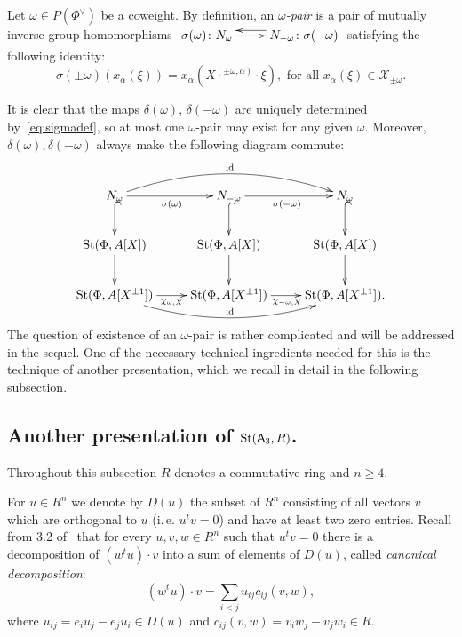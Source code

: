 \begin{dfn} \label{dfn:delta-pair}
Let $\omega \in P(\Phi^\vee)$ be a coweight.
By definition, an {\it $\omega$-pair} is a pair of mutually inverse group homomorphisms
$\xymatrix{ \sigma(\omega)\colon N_\omega \ar[r] & \ar@<-1.0ex>[l] N_{-\omega}\colon \sigma(-\omega) }$ satisfying the following identity:
\begin{equation} \label{eq:sigmadef}
\sigma(\pm \omega)(x_\alpha(\xi)) = x_\alpha(X^{(\pm \omega, \alpha)}\cdot \xi),
 \text{ for all } x_\alpha(\xi) \in \mathcal{X}_{\pm\omega}.
\end{equation}\end{dfn}
It is clear that the maps $\delta(\omega)$, $\delta(-\omega)$ are uniquely determined by~\eqref{eq:sigmadef}, so at most one $\omega$-pair may exist for any given $\omega$.
Moreover, $\delta(\omega), \delta(-\omega)$ always make the following diagram commute:
\begin{equation} \label{eq:sigma-diagram}
\xymatrix{ N_\omega \ar[r]_{\sigma(\omega)}\ar@{^{(}->}[d] \ar@/^1.5pc/[rr]^{\mathrm{id}} & N_{-\omega} \ar@{^{(}->}[d] \ar[r]_{\sigma(-\omega)} & N_\omega \ar@{^{(}->}[d] \\
          \St(\Phi, A[X]) \ar[d] & \St(\Phi, A[X]) \ar[d] & \St(\Phi, A[X]) \ar[d] \\
          \St(\Phi, A[X^{\pm 1}]) \ar@<-0.0ex>[r]_{\chi_{\omega, X}} \ar@/_1.5pc/[rr]^{\mathrm{id}} & \St(\Phi, A[X^{\pm 1}]) \ar@<-0.0ex>[r]_{\chi_{-\omega, X}} & \St(\Phi, A[X^{\pm 1}]).} \end{equation}
The question of existence of an $\omega$-pair is rather complicated and will be addressed in the sequel.
One of the necessary technical ingredients needed for this is the technique of another presentation, which we recall in detail in the following subsection.
\subsection{Another presentation of $\operatorname{St}(\mathsf{A}_3, R)$.} \label{subsec:another-presentation}
Throughout this subsection $R$ denotes a commutative ring and $n \geq 4$.

For $u \in R^n$ we denote by $D(u)$ the subset of $R^n$ consisting of all vectors $v$ which are orthogonal to $u$
(i.\,e. $u^{t} v = 0$) and have at least two zero entries.
Recall from 3.2 of~\cite{Ka77} that for every $u, v, w \in R^n$ such that $u^t v = 0$ there
is a decomposition of $(w^t u) \cdot v$ into a sum of elements of $D(u)$, called \textit{canonical decomposition}:
\begin{equation}
    \label{eq:canonical} (w^tu) \cdot v=\sum_{i<j}u_{ij} c_{ij}(v, w),
\end{equation}
where $u_{ij} =e_i u_j-e_j u_i \in D(u)$ and $c_{ij}(v, w) =v_i w_j-v_j w_i \in R$.

